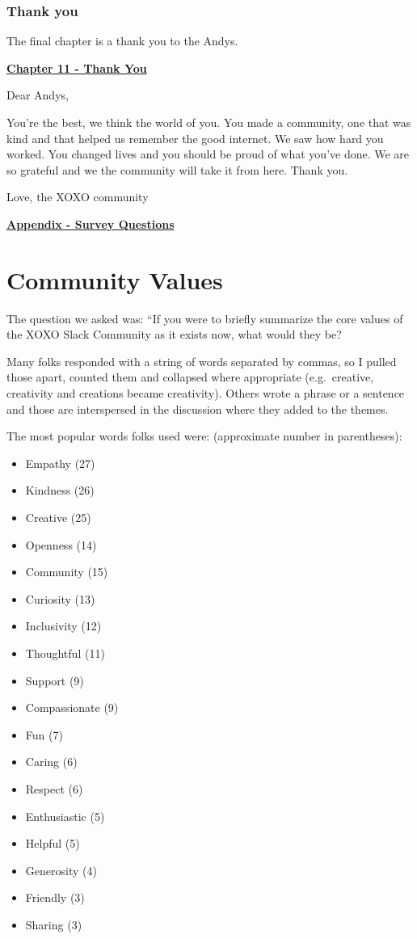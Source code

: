 \documentclass[
]{book}
\providecommand{\tightlist}{%
  \setlength{\itemsep}{0pt}\setlength{\parskip}{0pt}}
\begin{document}
\subsection{Thank you}\label{thank-you}

The final chapter is a thank you to the Andys.

\textbf{\href{https://bduckles.github.io/XOXOReport_BD/thank-you-to-the-andys.html}{Chapter 11 - Thank You}}

Dear Andys,

You're the best, we think the world of you. You made a community, one that was kind and that helped us remember the good internet. We saw how hard you worked. You changed lives and you should be proud of what you've done. We are so grateful and we the community will take it from here. Thank you.

Love, the XOXO community

\textbf{\href{https://bduckles.github.io/XOXOReport_BD/appendix---survey-questions.html}{Appendix - Survey Questions}}

\chapter{Community Values}\label{community-values}

The question we asked was: ``If you were to briefly summarize the core values of the XOXO Slack Community as it exists now, what would they be?

Many folks responded with a string of words separated by commas, so I pulled those apart, counted them and collapsed where appropriate (e.g.~creative, creativity and creations became creativity). Others wrote a phrase or a sentence and those are interspersed in the discussion where they added to the themes.

The most popular words folks used were: (approximate number in parentheses):

\begin{itemize}
\tightlist
\item
  Empathy (27)
\item
  Kindness (26)
\item
  Creative (25)
\item
  Openness (14)
\item
  Community (15)
\item
  Curiosity (13)
\item
  Inclusivity (12)
\item
  Thoughtful (11)
\item
  Support (9)
\item
  Compassionate (9)
\item
  Fun (7)
\item
  Caring (6)
\item
  Respect (6)
\item
  Enthusiastic (5)
\item
  Helpful (5)
\item
  Generosity (4)
\item
  Friendly (3)
\item
  Sharing (3)
\end{itemize}
\end{document}
